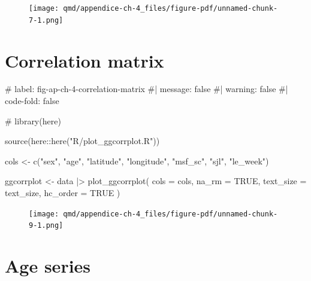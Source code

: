 \documentclass[
  12pt,
  a4paper,
  oneside]{tesesusp}
\newenvironment{Shaded}{\begin{snugshade}}{\end{snugshade}}
\newcommand{\AttributeTok}[1]{\textcolor[rgb]{0.40,0.45,0.13}{#1}}
\newcommand{\CommentTok}[1]{\textcolor[rgb]{0.37,0.37,0.37}{#1}}
\newcommand{\ConstantTok}[1]{\textcolor[rgb]{0.56,0.35,0.01}{#1}}
\newcommand{\FunctionTok}[1]{\textcolor[rgb]{0.28,0.35,0.67}{#1}}
\newcommand{\NormalTok}[1]{\textcolor[rgb]{0.00,0.23,0.31}{#1}}
\newcommand{\OtherTok}[1]{\textcolor[rgb]{0.00,0.23,0.31}{#1}}
\newcommand{\SpecialCharTok}[1]{\textcolor[rgb]{0.37,0.37,0.37}{#1}}
\newcommand{\StringTok}[1]{\textcolor[rgb]{0.13,0.47,0.30}{#1}}
\begin{document}
\begin{figure}[H]

{\centering \texttt{[image: qmd/appendice-ch-4\_files/figure-pdf/unnamed-chunk-7-1.png]}

}

\end{figure}

\hypertarget{correlation-matrix}{%
\section{Correlation matrix}\label{correlation-matrix}}

\begin{Shaded}
\begin{Highlighting}[numbers=left,,]
\CommentTok{\# label: fig{-}ap{-}ch{-}4{-}correlation{-}matrix}
\CommentTok{\#| message: false}
\CommentTok{\#| warning: false}
\CommentTok{\#| code{-}fold: false}

\CommentTok{\# library(here)}

\FunctionTok{source}\NormalTok{(here}\SpecialCharTok{::}\FunctionTok{here}\NormalTok{(}\StringTok{"R/plot\_ggcorrplot.R"}\NormalTok{))}

\NormalTok{cols }\OtherTok{\textless{}{-}} \FunctionTok{c}\NormalTok{(}\StringTok{"sex"}\NormalTok{, }\StringTok{"age"}\NormalTok{, }\StringTok{"latitude"}\NormalTok{, }\StringTok{"longitude"}\NormalTok{, }\StringTok{"msf\_sc"}\NormalTok{, }\StringTok{"sjl"}\NormalTok{, }\StringTok{"le\_week"}\NormalTok{)}

\NormalTok{ggcorrplot }\OtherTok{\textless{}{-}}
\NormalTok{  data }\SpecialCharTok{|\textgreater{}}
  \FunctionTok{plot\_ggcorrplot}\NormalTok{(}
    \AttributeTok{cols =}\NormalTok{ cols, }
    \AttributeTok{na\_rm =} \ConstantTok{TRUE}\NormalTok{, }
    \AttributeTok{text\_size =}\NormalTok{ text\_size, }
    \AttributeTok{hc\_order =} \ConstantTok{TRUE}
\NormalTok{    )}
\end{Highlighting}
\end{Shaded}

\begin{figure}[H]

{\centering \texttt{[image: qmd/appendice-ch-4\_files/figure-pdf/unnamed-chunk-9-1.png]}

}

\end{figure}

\hypertarget{age-series}{%
\section{Age series}\label{age-series}}
\end{document}
